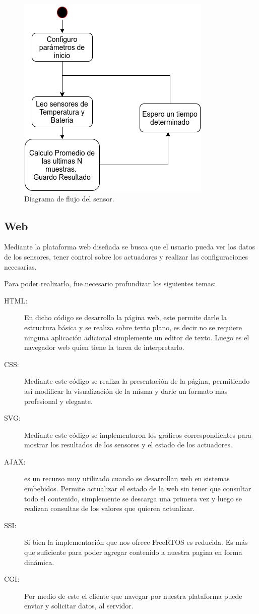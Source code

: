 \begin{figure}[!hp]
  \centering
  \includegraphics[scale=.5]{./Figures/sensor_task.png}
  \caption{Diagrama de flujo del sensor.}
  \label{fig:sensor_task}
\end{figure}

\subsection{Web}
Mediante la plataforma web diseñada se busca que el usuario pueda ver los datos de los sensores, tener control sobre los actuadores y realizar las configuraciones necesarias. 

Para poder realizarlo, fue necesario profundizar los siguientes temas:
\begin{description}
    \item[HTML:] En dicho código se desarrollo la página web, este permite darle la estructura básica y se realiza sobre texto plano, es decir no se requiere ninguna aplicación adicional simplemente un editor de texto. Luego es el navegador web quien tiene la tarea de interpretarlo. 
    \item[CSS:] Mediante este código se realiza la presentación de la página, permitiendo así modificar la visualización de la misma y darle un formato mas profesional y elegante.
    \item[SVG:] Mediante este código se implementaron los gráficos correspondientes para mostrar los resultados de los sensores y el estado de los actuadores.
    \item[AJAX:] es un recurso muy utilizado cuando se desarrollan web en sistemas embebidos. Permite actualizar el estado de la web sin tener que consultar todo el contenido, simplemente se descarga una primera vez y luego se realizan consultas de los valores que quieren actualizar. 
    \item[SSI:] Si bien la implementación que nos ofrece FreeRTOS es reducida. Es más que suficiente para poder agregar contenido a nuestra pagina en forma dinámica.
    \item[CGI:] Por medio de este el cliente que navegar por nuestra plataforma puede enviar y solicitar datos, al servidor.
\end{description}

